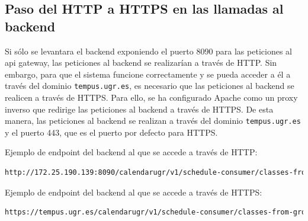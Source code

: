 \subsection{Paso del HTTP a HTTPS en las llamadas al backend}
Si sólo se levantara el backend exponiendo el puerto 8090 para las peticiones al api gateway, las peticiones al backend se realizarían a través de HTTP. Sin embargo, para que el sistema funcione correctamente y se pueda acceder a él a través del dominio \texttt{tempus.ugr.es}, es necesario que las peticiones al backend se realicen a través de HTTPS.
Para ello, se ha configurado Apache como un proxy inverso que redirige las peticiones al backend a través de HTTPS. De esta manera, las peticiones al backend se realizan a través del dominio \texttt{tempus.ugr.es} y el puerto 443, que es el puerto por defecto para HTTPS.

Ejemplo de endpoint del backend al que se accede a través de HTTP:

\lstset{inputencoding=utf8}
\begin{lstlisting}[language=bash]
http://172.25.190.139:8090/calendarugr/v1/schedule-consumer/classes-from-group
\end{lstlisting}

Ejemplo de endpoint del backend al que se accede a través de HTTPS:

\lstset{inputencoding=utf8}
\begin{lstlisting}[language=bash]
https://tempus.ugr.es/calendarugr/v1/schedule-consumer/classes-from-group
\end{lstlisting}

